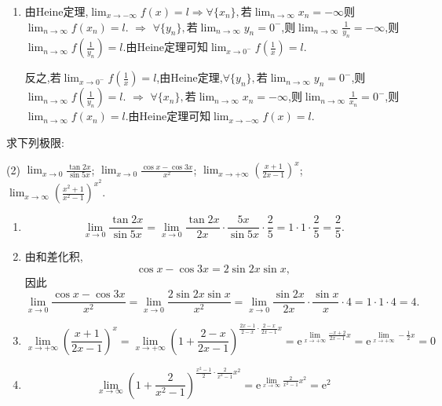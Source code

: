 \begin{solution}
\begin{enumerate}[(1)]
        \item 由Heine定理,$\lim_{x \to -\infty} f(x) = l \Rightarrow \forall \{x_n\},$若$\lim_{n \to \infty} x_n = -\infty$则$\lim_{n \to \infty} f(x_n) = l$. $\Rightarrow$ $\forall \{ y_n \},$若$\lim_{n \to \infty} y_n = 0^-$,则$\lim_{n \to \infty} \frac{1}{y_n} = -\infty$,则$\lim_{n \to \infty} f\left( \frac{1}{y_n} \right) = l$.由Heine定理可知$\lim_{x \to 0^-} f\left(\frac{1}{x}\right)=l$.

              反之,若$\lim_{x \to 0^-} f\left(\frac{1}{x}\right)=l$,由Heine定理,$\forall \{y_n\},$若$\lim_{n \to \infty} y_n = 0^-$,则$\lim_{n \to \infty} f\left( \frac{1}{y_n} \right) = l$. $\Rightarrow$ $\forall \{x_n\},$若$\lim_{n \to \infty} x_n = -\infty$,则$\lim_{n \to \infty} \frac{1}{x_n} = 0^-$,则$\lim_{n \to \infty} f(x_n) = l$.由Heine定理可知$\lim_{x \to -\infty} f(x) = l$.
    \end{enumerate}
\end{solution}

\begin{exercise}[1.3.9]
    求下列极限:
    \begin{tasks}[label=(\arabic*)](2)
        \task $\lim_{x \to 0} \frac{\tan 2x}{\sin 5x}$;
        \task $\lim_{x \to 0} \frac{\cos x - \cos 3x}{x^2}$;
        \task $\lim_{x \to +\infty} \left(\frac{x+1}{2x-1}\right)^x$;
        \task $\lim_{x \to \infty} \left(\frac{x^2+1}{x^2-1}\right)^{x^2}$.
    \end{tasks}
\end{exercise}

\begin{solution}
    \begin{enumerate}[(1)]
        \item $$\lim_{x \to 0} \frac{\tan 2x}{\sin 5x} = \lim_{x \to 0} \frac{\tan 2x}{2x} \cdot \frac{5x}{\sin 5x} \cdot \frac{2}{5} = 1 \cdot 1 \cdot \frac{2}{5} = \frac{2}{5}.$$
        \item 由和差化积,$$ \cos x - \cos 3x = 2 \sin 2x \sin x,$$因此$$\lim_{x \to 0} \frac{\cos x - \cos 3x}{x^2} = \lim_{x \to 0} \frac{2 \sin 2x \sin x}{x^2} = \lim_{x \to 0} \frac{\sin 2x}{2x} \cdot \frac{\sin x}{x} \cdot 4 = 1 \cdot 1 \cdot 4 = 4.$$
        \item $$
                  \lim_{x \to + \infty} \left(\frac{x+1}{2x-1}\right)^x = \lim_{x \to + \infty} \left( 1 + \frac{2 - x}{2x - 1} \right)^{\frac{2x -1}{2 -x} \cdot \frac{2 - x}{2x -1} x} = \mathrm{e}^{\lim_{x \to + \infty} \frac{-x + 2}{2x - 1} x} = \mathrm{e}^{\lim_{x \to + \infty} - \frac12 x} = 0
              $$
        \item $$
                  \lim_{x \to \infty} \left(1 + \frac{2}{x^2 - 1}\right)^{\frac{x^2 - 1}{2} \cdot \frac{2}{x^2 - 1} x^2} = \mathrm{e}^{\lim_{x \to \infty} \frac{2}{x^2 - 1} x^2} = \mathrm{e}^2
              $$
    \end{enumerate}
\end{solution}

